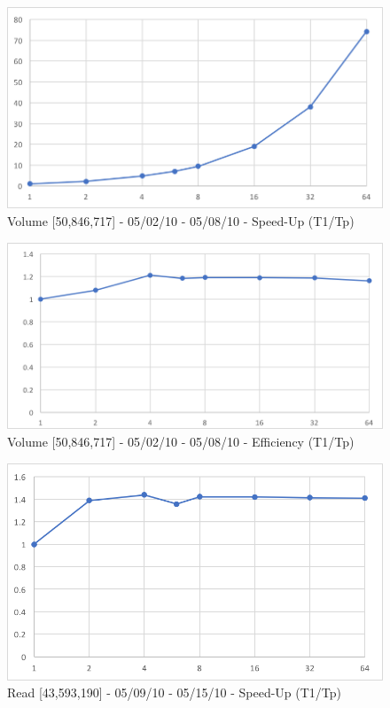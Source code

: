 \documentclass[12pt]{article} %
\begin{document}
\begin{figure}[htb]
\caption{Volume [50,846,717] - 05/02/10 - 05/08/10 - Speed-Up (T1/Tp)}\label{fig:benchmark01}
\centering
\includegraphics[width=15cm,keepaspectratio]{imgs/img05.png}
\end{figure} 

\begin{figure}[htb]
\caption{Volume [50,846,717] - 05/02/10 - 05/08/10 - Efficiency (T1/Tp)}\label{fig:benchmark01}
\centering
\includegraphics[width=15cm,keepaspectratio]{imgs/img06.png}
\end{figure} 


\begin{figure}[htb]
\caption{Read [43,593,190] - 05/09/10 - 05/15/10 - Speed-Up (T1/Tp)}\label{fig:benchmark01}
\centering
\includegraphics[width=15cm,keepaspectratio]{imgs/img01.png}
\end{figure} 
\end{document}

